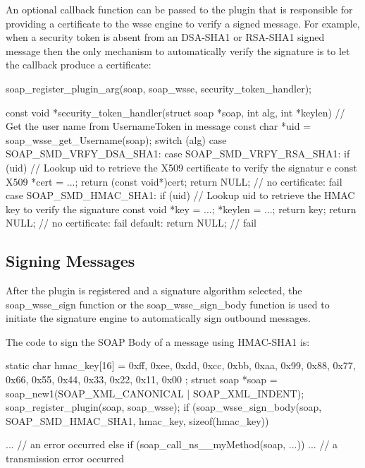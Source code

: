An optional callback function can be passed to the plugin that is responsible for providing a certificate to the wsse engine to verify a signed message. For example, when a security token is absent from an DSA-\/SHA1 or RSA-\/SHA1 signed message then the only mechanism to automatically verify the signature is to let the callback produce a certificate:


\begin{DoxyCode}
    soap_register_plugin_arg(soap, soap_wsse, security_token_handler);

    const void *security_token_handler(struct soap *soap, int alg, int *keylen)
    { // Get the user name from UsernameToken in message
      const char *uid = soap_wsse_get_Username(soap);
      switch (alg)
      { case SOAP_SMD_VRFY_DSA_SHA1:
        case SOAP_SMD_VRFY_RSA_SHA1:
          if (uid)
          { // Lookup uid to retrieve the X509 certificate to verify the signatur
      e
            const X509 *cert = ...; 
            return (const void*)cert;
          }
          return NULL; // no certificate: fail
        case SOAP_SMD_HMAC_SHA1:
          if (uid)
          { // Lookup uid to retrieve the HMAC key to verify the signature
            const void *key = ...; 
            *keylen = ...;
            return key;
          }
          return NULL; // no certificate: fail
        default:
          return NULL; // fail
      }
    }
\end{DoxyCode}
\hypertarget{wsse_wsse_8_2a}{}\subsection{Signing Messages}\label{wsse_wsse_8_2a}
After the plugin is registered and a signature algorithm selected, the soap\_\-wsse\_\-sign function or the soap\_\-wsse\_\-sign\_\-body function is used to initiate the signature engine to automatically sign outbound messages.

The code to sign the SOAP Body of a message using HMAC-\/SHA1 is:


\begin{DoxyCode}
    static char hmac_key[16] =
    { 0xff, 0xee, 0xdd, 0xcc, 0xbb, 0xaa, 0x99, 0x88,
      0x77, 0x66, 0x55, 0x44, 0x33, 0x22, 0x11, 0x00 };
    struct soap *soap = soap_new1(SOAP_XML_CANONICAL | SOAP_XML_INDENT);
    soap_register_plugin(soap, soap_wsse);
    if (soap_wsse_sign_body(soap, SOAP_SMD_HMAC_SHA1, hmac_key, sizeof(hmac_key))
      
      ... // an error occurred
    else if (soap_call_ns__myMethod(soap, ...))
      ... // a transmission error occurred
\end{DoxyCode}


